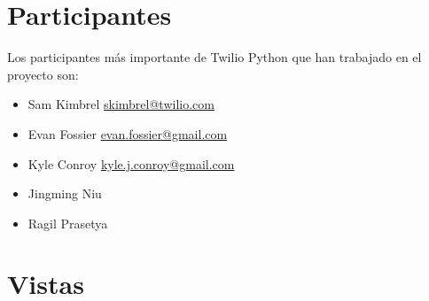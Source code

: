 \documentclass{article}
\begin{document}
\section{Participantes}

Los participantes más importante de Twilio Python que han trabajado en el proyecto son:
\begin{itemize}
  \item Sam Kimbrel \href{mailto:skimbrel@twilio.com}{skimbrel@twilio.com}
  \item Evan Fossier \href{mailto:evan.fossier@gmail.com}{evan.fossier@gmail.com}
  \item Kyle Conroy \href{mailto:kyle.j.conroy@gmail.com}{kyle.j.conroy@gmail.com}
  \item Jingming Niu 
  \item Ragil Prasetya 
  
  \end{itemize}
  




\section{Vistas}
\end{document}
